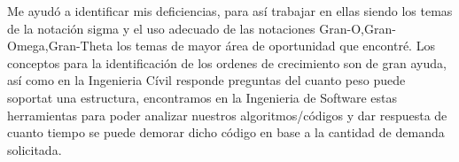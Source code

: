 \documentclass{article}
\begin{document}
Me ayudó a identificar mis deficiencias, para así trabajar en ellas siendo los temas de la notación sigma y el uso adecuado de las notaciones Gran-O,Gran-Omega,Gran-Theta los temas de mayor área de oportunidad que encontré. Los conceptos para la identificación de los ordenes de crecimiento son de gran ayuda, así como en la Ingenieria Cívil responde preguntas del cuanto peso puede soportat una estructura, encontramos en la Ingenieria de Software estas herramientas para poder analizar nuestros algoritmos/códigos y dar respuesta de cuanto tiempo se puede demorar dicho código en base a la cantidad de demanda solicitada. 
\end{document}
